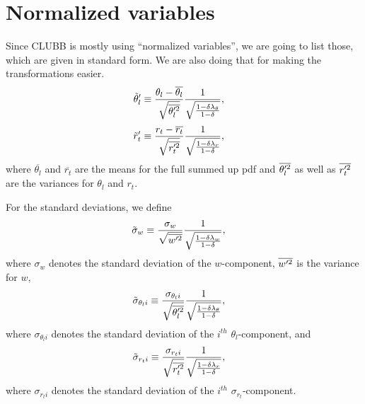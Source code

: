\section{Normalized variables}\label{sec:normalized-variables}

Since \gls{CLUBB} is mostly using \enquote{normalized variables},
we are going to list those, which are given in standard form.
We are also doing that for making the transformations easier.
\begin{align}
    \label{eq:theta_l_prime_tilde}
    \tilde{\theta}_l'
    &\equiv \frac{\theta_l - \overline{\theta_l}}{\sqrt{\overline{\theta_l'^2}}}
    \frac{1}{\sqrt{\frac{1 - \delta \lambda_\theta}{1 - \delta}}},
\end{align}
\begin{align}
    \label{eq:r_t_prime_tilde}
    \tilde{r}_t'
    &\equiv \frac{r_t - \overline{r_t}}{\sqrt{\overline{r_t'^2}}}
    \frac{1}{\sqrt{\frac{1 - \delta \lambda_r}{1 - \delta}}},
\end{align}
where $\overline{\theta_l}$ and $\overline{r_t}$ are the means for the full summed up \gls{pdf}
and $\overline{\theta_l'^2}$ as well as $\overline{r_t'^2}$ are the variances for $\theta_l$ and $r_t$.

For the standard deviations, we define
\begin{align}
    \label{eq:sigma_w_tilde}
    {\tilde{\sigma}_w}
    &\equiv \frac{\sigma_w}{\sqrt{\overline{w'^2}}}
    \frac{1}{\sqrt{\frac{1-\delta\lambda_w}{1-\delta}}},
\end{align}
where $\sigma_w$ denotes the standard deviation of the $w$-component,
$\overline{w'^2}$ is the variance for $w$,
\begin{align}
    \label{eq:sigma_theta_l_i_tilde}
    \tilde{\sigma}_{\theta_l i}
    &\equiv \frac{\sigma_{\theta_l i}}{\sqrt{\overline{\theta_l'^2}}}
    \frac{1}{\sqrt{\frac{1-\delta\lambda_\theta}{1-\delta}}},
\end{align}
where $\sigma_{\theta_l i}$ denotes the standard deviation of the $i^{th}$ $\theta_l$-component,
and
\begin{align}
    \label{eq:sigma_r_t_i_tilde}
    \tilde{\sigma}_{r_t i}
    &\equiv \frac{\sigma_{r_t i}}{\sqrt{\overline{r_t'^2}}}
    \frac{1}{\sqrt{\frac{1-\delta\lambda_r}{1-\delta}}},
\end{align}
where $\sigma_{r_t i}$ denotes the standard deviation of the $i^{th}$ $\sigma_{r_t}$-component.